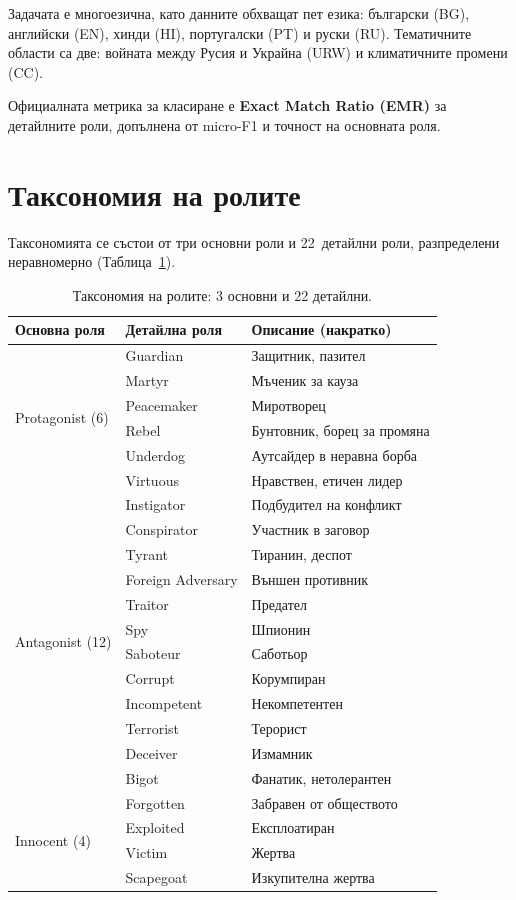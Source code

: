 \documentclass[12pt,a4paper]{report}
\begin{document}
Задачата е многоезична, като данните обхващат пет езика: български (BG), английски (EN), хинди (HI), португалски (PT) и руски (RU). Тематичните области са две: войната между Русия и Украйна (URW) и климатичните промени (CC).

Официалната метрика за класиране е \textbf{Exact Match Ratio (EMR)} за детайлните роли, допълнена от micro-F1 и точност на основната роля.


\section{Таксономия на ролите}

Таксономията се състои от три основни роли и 22~детайлни роли, разпределени неравномерно (Таблица~\ref{tab:taxonomy}).

\begin{table}[H]
\centering
\caption{Таксономия на ролите: 3 основни и 22 детайлни.}
\label{tab:taxonomy}
\small
\begin{tabular}{lll}
\toprule
\textbf{Основна роля} & \textbf{Детайлна роля} & \textbf{Описание (накратко)} \\
\midrule
\multirow{6}{*}{Protagonist (6)}
  & Guardian      & Защитник, пазител \\
  & Martyr        & Мъченик за кауза \\
  & Peacemaker    & Миротворец \\
  & Rebel         & Бунтовник, борец за промяна \\
  & Underdog      & Аутсайдер в неравна борба \\
  & Virtuous      & Нравствен, етичен лидер \\
\midrule
\multirow{12}{*}{Antagonist (12)}
  & Instigator    & Подбудител на конфликт \\
  & Conspirator   & Участник в заговор \\
  & Tyrant        & Тиранин, деспот \\
  & Foreign Adversary & Външен противник \\
  & Traitor       & Предател \\
  & Spy           & Шпионин \\
  & Saboteur      & Саботьор \\
  & Corrupt       & Корумпиран \\
  & Incompetent   & Некомпетентен \\
  & Terrorist     & Терорист \\
  & Deceiver      & Измамник \\
  & Bigot         & Фанатик, нетолерантен \\
\midrule
\multirow{4}{*}{Innocent (4)}
  & Forgotten     & Забравен от обществото \\
  & Exploited     & Експлоатиран \\
  & Victim        & Жертва \\
  & Scapegoat     & Изкупителна жертва \\
\bottomrule
\end{tabular}
\end{table}
\end{document}
